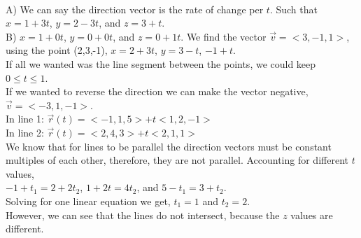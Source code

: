 \documentclass{article}
\begin{document}
\sol\\
A) We can say the direction vector is the rate of change per $t$. Such that $x = 1+3t$, $y = 2-3t$, and $z = 3+t$. \\
B) $x = 1 + 0t$, $y = 0 + 0t$, and $z = 0 + 1t$.
\sol We find the vector $\vec{v} = <3,-1,1>$, using the point (2,3,-1), $x = 2+3t$, $y=3-t$, $-1+t$. \\
If all we wanted was the line segment between the points, we could keep $0 \le t \le 1$. \\
If we wanted to reverse the direction we can make the vector negative, $\vec{v} = <-3,1,-1>$.
\sol \\
In line 1: $\vec{r}(t) = <-1,1,5> + t<1,2,-1>$ \\
In line 2: $\vec{r}(t) = <2,4,3> + t<2,1,1>$ \\
We know that for lines to be parallel the direction vectors must be constant multiples of each other, therefore, they are not parallel.
\double
Accounting for different $t$ values, \\
$-1 +t_1 = 2+2t_2$, $1+2t=4t_2$, and $5-t_1=3+t_2$. \\
Solving for one linear equation we get, $t_1 = 1$ and $t_2 = 2$. \\
However, we can see that the lines do not intersect, because the $z$ values are different.
\end{document}
